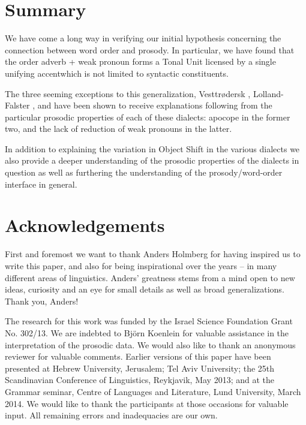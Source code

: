 \documentclass[output=paper]{LSP/langsci}
\begin{document}
\section{Summary}

We have come a long way in verifying our initial hypothesis concerning the connection between word order and prosody. In particular, we have found that the order adverb + weak pronoun forms a Tonal Unit licensed by a single unifying accent\largerpage which is not limited to syntactic constituents.

The three seeming exceptions to this generalization, Vesttrødersk , Lolland-Falster , and  have been shown to receive explanations following from the particular prosodic properties of each of these dialects: apocope in the former two, and the lack of reduction of weak pronouns in the latter.

In addition to explaining the variation in Object Shift in the various dialects we also provide a deeper understanding of the prosodic properties of the dialects in {question} as well as furthering the understanding of the prosody/word-order interface in general.

\section*{Acknowledgements}

First and foremost we want to thank Anders Holmberg for having inspired us to write this paper, and also for being inspirational over the years – in many different areas of linguistics. Anders’ greatness stems from a mind open to new ideas, curiosity and an eye for small details as well as broad generalizations. Thank you, Anders! 

The research for this work was funded by the Israel Science Foundation Grant No. 302/13. We are indebted to Björn Koenlein for valuable assistance in the interpretation of the prosodic data. We would also like to thank an anonymous reviewer for valuable comments. Earlier versions of this paper have been presented at {Hebrew} University, Jerusalem; Tel Aviv University; the 25th {Scandinavian} Conference of Linguistics, Reykjavik, May 2013; and at the Grammar seminar, Centre of Languages and Literature, Lund University, March 2014. We would like to thank the participants at those occasions for valuable input. All remaining errors and inadequacies are our own.
{\sloppy
\printbibliography[heading=subbibliography,notkeyword=this]
}
\end{document}
